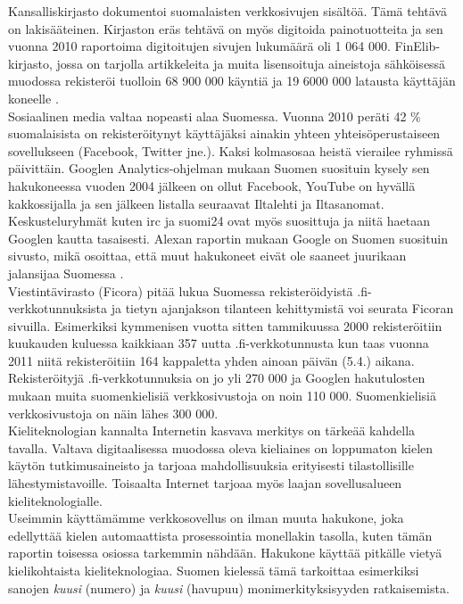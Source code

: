 \begin{multicols}{2}
Kansalliskirjasto dokumentoi suomalaisten verkkosivujen sisältöä. Tämä
tehtävä on lakisääteinen. Kirjaston eräs tehtävä on myös digitoida
painotuotteita ja sen vuonna 2010 raportoima digitoitujen sivujen
lukumäärä oli 1 064 000.  FinElib-kirjasto, jossa on tarjolla
artikkeleita ja muita lisensoituja aineistoja sähköisessä muodossa
rekisteröi tuolloin 68 900 000 käyntiä ja 19 6000 000 latausta
käyttäjän koneelle \cite{natlibstat}.\\
Sosiaalinen media valtaa nopeasti alaa Suomessa. Vuonna 2010 peräti 42
\% suomalaisista on rekisteröitynyt käyttäjäksi ainakin yhteen
yhteisöperustaiseen sovellukseen (Facebook, Twitter jne.). Kaksi
kolmasosaa heistä vierailee ryhmissä päivittäin. Googlen Analytics-ohjelman
mukaan Suomen suosituin kysely sen hakukoneessa vuoden 2004
jälkeen on ollut Facebook, YouTube on hyvällä kakkossijalla ja sen
jälkeen listalla seuraavat Iltalehti ja Iltasanomat. Keskusteluryhmät
kuten irc ja suomi24 ovat myös suosittuja ja niitä haetaan Googlen
kautta tasaisesti. Alexan raportin mukaan Google on Suomen suosituin
sivusto, mikä osoittaa, että muut hakukoneet eivät ole saaneet
juurikaan jalansijaa Suomessa \cite{topsites}.\\
Viestintävirasto (Ficora) pitää lukua Suomessa rekisteröidyistä
.fi-verkkotunnuksista ja tietyn ajanjakson tilanteen kehittymistä voi
seurata Ficoran sivuilla. Esimerkiksi kymmenisen vuotta sitten
tammikuussa 2000 rekisteröitiin kuukauden kuluessa kaikkiaan 357 uutta
.fi-verkkotunnusta kun taas vuonna 2011 niitä rekisteröitiin 164
kappaletta yhden ainoan päivän (5.4.)  aikana. Rekisteröityjä
.fi-verkkotunnuksia on jo yli 270 000 ja Googlen hakutulosten mukaan
muita suomenkielisiä verkkosivustoja on noin 110 000.  Suomenkielisiä
verkkosivustoja on näin lähes 300 000.\\
Kieliteknologian kannalta Internetin kasvava merkitys on tärkeää
kahdella tavalla. Valtava digitaalisessa muodossa oleva kieliaines
on loppumaton kielen käytön tutkimusaineisto ja tarjoaa mahdollisuuksia erityisesti 
tilastollisille  lähestymistavoille. Toisaalta Internet tarjoaa myös 
laajan sovellusalueen kieliteknologialle.\\
Useimmin käyttämämme verkkosovellus on ilman muuta hakukone, joka
edellyttää kielen automaattista prosessointia monellakin tasolla,
kuten tämän raportin toisessa osiossa tarkemmin nähdään. Hakukone käyttää
pitkälle vietyä kielikohtaista kieliteknologiaa. Suomen kielessä tämä tarkoittaa 
esimerkiksi  sanojen \textit{kuusi} (numero)
ja \textit{kuusi} (havupuu) monimerkityksisyyden ratkaisemista.\\

\end{multicols}
